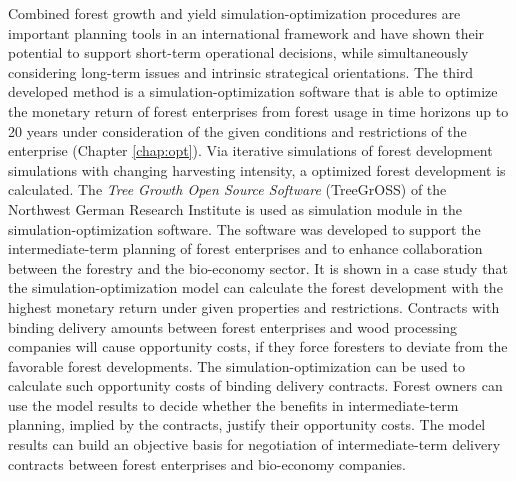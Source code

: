 Combined forest growth and yield si\-mu\-la\-tion-op\-ti\-mi\-za\-tion procedures are important planning tools in an international framework and have shown their potential to support short-term operational decisions, while simultaneously considering long-term issues and intrinsic strategical orientations. The third developed method is a si\-mu\-la\-tion-op\-ti\-mi\-za\-tion software that is able to optimize the monetary return of forest enterprises from forest usage in time horizons up to 20 years under consideration of the given conditions and restrictions of the enterprise (Chapter \ref{chap:opt}). Via iterative simulations of forest development simulations with changing harvesting intensity, a optimized forest development is calculated. The \textit{Tree Growth Open Source Software} (TreeGrOSS) of the Northwest German Research Institute is used as simulation module in the si\-mu\-la\-tion-op\-ti\-mi\-za\-tion software. The software was developed to support the intermediate-term planning of forest enterprises and to enhance collaboration between the forestry and the bio-economy sector. It is shown in a case study that the si\-mu\-la\-tion-op\-ti\-mi\-za\-tion model can calculate the forest development with the highest monetary return under given properties and restrictions. Contracts with binding delivery amounts between forest enterprises and wood processing companies will cause opportunity costs, if they force foresters to deviate from the favorable forest developments. The si\-mu\-la\-tion-op\-ti\-mi\-za\-tion can be used to calculate such opportunity costs of binding delivery contracts. Forest owners can use the model results to decide whether the benefits in intermediate-term planning, implied by the contracts, justify their opportunity costs. The model results can build an objective basis for negotiation of intermediate-term delivery contracts between forest enterprises and bio-economy companies.